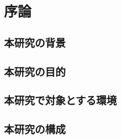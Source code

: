 \chapter{序論}
\label{chap:introduction}

\section{本研究の背景}

\section{本研究の目的}

\section{本研究で対象とする環境}

\section{本研究の構成}
